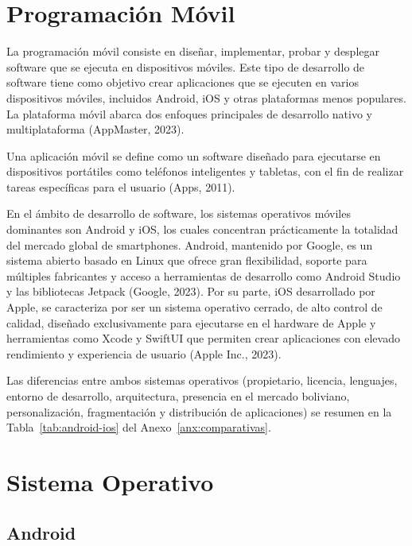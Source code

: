 \section{Programación Móvil}
\label{sec:programacion-movil}

La programación móvil consiste en diseñar, implementar, probar y desplegar
software que se ejecuta en dispositivos móviles. Este tipo de desarrollo de
software tiene como objetivo crear aplicaciones que se ejecuten en varios
dispositivos móviles, incluidos Android, iOS y otras plataformas menos
populares. La plataforma móvil abarca dos enfoques principales de desarrollo
nativo y multiplataforma (AppMaster, 2023).

Una aplicación móvil se define como un software diseñado para ejecutarse en
dispositivos portátiles como teléfonos inteligentes y tabletas, con el fin de
realizar tareas específicas para el usuario (Apps, 2011).

En el ámbito de desarrollo de software, los sistemas operativos móviles
dominantes son Android y iOS, los cuales concentran prácticamente la totalidad
del mercado global de smartphones. Android, mantenido por Google, es un sistema
abierto basado en Linux que ofrece gran flexibilidad, soporte para múltiples
fabricantes y acceso a herramientas de desarrollo como Android Studio y las
bibliotecas Jetpack (Google, 2023). Por su parte, iOS desarrollado por Apple, se
caracteriza por ser un sistema operativo cerrado, de alto control de calidad,
diseñado exclusivamente para ejecutarse en el hardware de Apple y herramientas
como Xcode y SwiftUI que permiten crear aplicaciones con elevado rendimiento y
experiencia de usuario (Apple Inc., 2023).

Las diferencias entre ambos sistemas operativos (propietario, licencia, lenguajes, entorno de desarrollo, arquitectura, presencia en el mercado boliviano, personalización, fragmentación y distribución de aplicaciones) se resumen en la Tabla~\ref{tab:android-ios} del Anexo~\ref{anx:comparativas}.

\section{Sistema Operativo}
\label{sec:sistema-operativo}

\subsection{Android}

